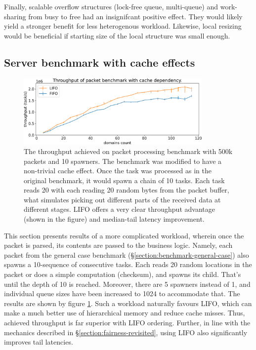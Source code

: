 \documentclass[12pt,a4paper,twoside]{report}
\begin{document}
Finally, scalable overflow structures (lock-free queue, multi-queue) and work-sharing from busy to free had an insignifcant positive effect. They would likely yield a stronger benefit for less heterogenous workload. Likewise, local resizing would be beneficial if starting size of the local structure was small enough.

\subsection{Server benchmark with cache effects}
\label{section:server-bench-with-cache-effects}

\begin{figure} 
    \centering 
    \includegraphics[width=0.85\textwidth]{eval/packet-basic-lifo-better.png}
    \caption{The throughput achieved on packet processing benchmark with 500k packets and 10 spawners. The benchmark was modified to have a non-trivial cache effect. Once the task was processed as in the original benchmark, it would spawn a chain of 10 tasks. Each task reads 20 with each reading 20 random bytes from the packet buffer, what simulates picking out different parts of the received data at different stages. LIFO offers a very clear throughput advantage (shown in the figure) and median-tail latency improvement.}
   \label{fig:packet-lifo-better}
\end{figure}

This section presents results of a more complicated workload, wherein once the packet is parsed, its contents are passed to the business logic. Namely, each packet from the general case benchmark (\S\ref{section:benchmark-general-case}) also spawns a 10-sequence of consecutive tasks. Each reads 20 random locations in the packet or does a simple computation (checksum), and spawns its child. That's until the depth of 10 is reached. Moreover, there are 5 spawners instead of 1, and individual queue sizes have been increased to 1024 to accommodate that. The results are shown by figure \ref{fig:packet-lifo-better}. Such a workload naturally favours LIFO, which can make a much better use of hierarchical memory and reduce cache misses. Thus, achieved throughput is far superior with LIFO ordering. Further, in line with the mechanics described in \S\ref{section:fairness-revisited}, using LIFO also significantly improves tail latencies.
\end{document}
